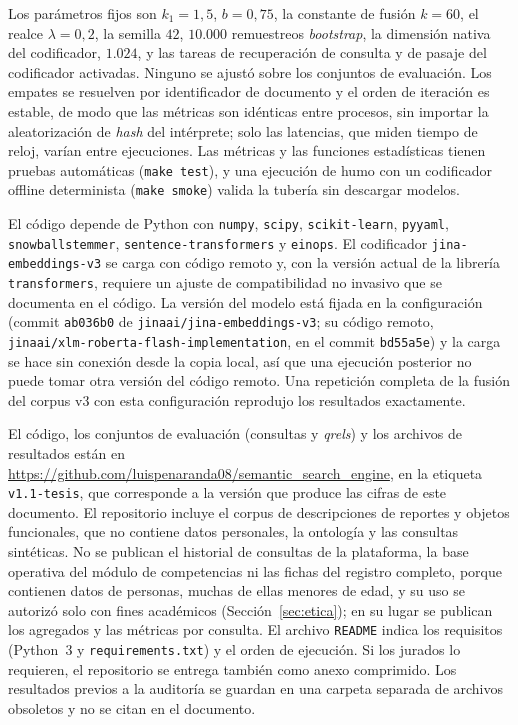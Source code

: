 \documentclass[11pt,letterpaper]{article}
\numberwithin{equation}{section}
\begin{document}
Los parámetros fijos son $k_1=1{,}5$, $b=0{,}75$, la constante de fusión $k=60$, el realce $\lambda=0{,}2$, la semilla $42$, $10.000$ remuestreos \textit{bootstrap}, la dimensión nativa del codificador, $1.024$, y las tareas de recuperación de consulta y de pasaje del codificador activadas. Ninguno se ajustó sobre los conjuntos de evaluación. Los empates se resuelven por identificador de documento y el orden de iteración es estable, de modo que las métricas son idénticas entre procesos, sin importar la aleatorización de \textit{hash} del intérprete; solo las latencias, que miden tiempo de reloj, varían entre ejecuciones. Las métricas y las funciones estadísticas tienen pruebas automáticas (\texttt{make test}), y una ejecución de humo con un codificador offline determinista (\texttt{make smoke}) valida la tubería sin descargar modelos.

El código depende de Python con \texttt{numpy}, \texttt{scipy}, \texttt{scikit-learn}, \texttt{pyyaml}, \texttt{snowballstemmer}, \texttt{sentence-transformers} y \texttt{einops}. El codificador \texttt{jina-embeddings-v3} se carga con código remoto y, con la versión actual de la librería \texttt{transformers}, requiere un ajuste de compatibilidad no invasivo que se documenta en el código. La versión del modelo está fijada en la configuración (commit \texttt{ab036b0} de \texttt{jinaai/jina-embeddings-v3}; su código remoto, \texttt{jinaai/xlm-roberta-flash-implementation}, en el commit \texttt{bd55a5e}) y la carga se hace sin conexión desde la copia local, así que una ejecución posterior no puede tomar otra versión del código remoto. Una repetición completa de la fusión del corpus v3 con esta configuración reprodujo los resultados exactamente.

El código, los conjuntos de evaluación (consultas y \textit{qrels}) y los archivos de resultados están en \url{https://github.com/luispenaranda08/semantic_search_engine}, en la etiqueta \texttt{v1.1-tesis}, que corresponde a la versión que produce las cifras de este documento.
El repositorio incluye el corpus de descripciones de reportes y objetos funcionales, que no contiene datos personales, la ontología y las consultas sintéticas. No se publican el historial de consultas de la plataforma, la base operativa del módulo de competencias ni las fichas del registro completo, porque contienen datos de personas, muchas de ellas menores de edad, y su uso se autorizó solo con fines académicos (Sección~\ref{sec:etica}); en su lugar se publican los agregados y las métricas por consulta. El archivo \texttt{README} indica los requisitos (Python~3 y \texttt{requirements.txt}) y el orden de ejecución. Si los jurados lo requieren, el repositorio se entrega también como anexo comprimido. Los resultados previos a la auditoría se guardan en una carpeta separada de archivos obsoletos y no se citan en el documento.
\end{document}
